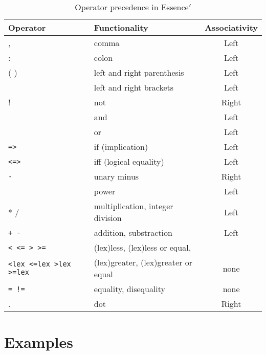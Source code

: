 \documentclass{article}
\begin{document}
\begin{table}


    
    \begin{center}
    \begin{tabular}{|l|lc|}
 
      \hline
       Operator & Functionality & Associativity \\
       \hline
       \hline
       ,   & comma & Left \\   
       \hline
       :   & colon & Left \\
       \hline
       ( ) & left and right parenthesis & Left \\
       \hline
       \verb1[ ]1 & left and right brackets & Left \\
       \hline
       ! & not & Right \\  
       \hline
       \verb1/\1 & and & Left \\ 
       \hline
       \verb1\/1 & or & Left \\ 
       \hline
        {\tt =>} & if (implication)  & Left \\ 
	\hline
        {\tt <=>} & iff (logical equality) & Left \\ 
	\hline
        {\tt -} & unary minus & Right \\
	\hline
        \verb1^1 & power & Left \\ 
	\hline
        * / & multiplication, integer division & Left \\ 
	\hline
        {\tt + -} & addition, substraction &  Left \\
	\hline
        {\tt < <= > >= } & (lex)less, (lex)less or equal, &  \\ 
	{\tt <lex <=lex >lex >=lex } & (lex)greater, (lex)greater or equal & none \\ 
	\hline
        {\tt = !=} & equality, disequality & none \\
	\hline
        . & dot & Right \\ 
	\hline

      \end{tabular}\label{tab:precedence}
\end{center}
    \caption{Operator precedence in {\sc Essence}$'$}


\end{table}


\section{Examples}
\end{document}
